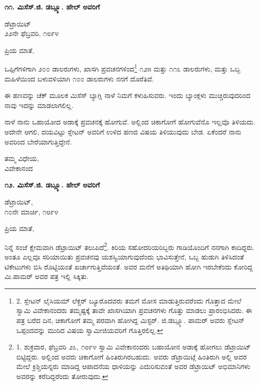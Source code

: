 \begin{center}
\textbf{೧೧. ಮಿಸೆಸ್.ಜಿ. ಡಬ್ಲ್ಯೂ. ಹೇಲ್ ಅವರಿಗೆ}
\end{center}

\begin{flushright}
ಡೆಟ್ರಾಯಿಟ್\\೨೨ನೇ ಫೆಬ್ರವರಿ, ೧೮೯೪
\end{flushright}

ಪ್ರಿಯ ಮಾತೆ,

ಒಪ್ಪಿಗೆಗಳಿಗಾಗಿ ೨೦೦ ಡಾಲರುಗಳು, ಖಾಸಗಿ ಪ್ರವಚನಗಳಿಂದ\footnote{2. ಸ್ಲೇಟನ್ ಲೈಸಿಯಮ್​ ಲೆಕ್ಚರ್ ಬ್ಯೂರೊದವರು ತಮಗೆ ಮೋಸ ಮಾಡುತ್ತಿರುವರೆಂದು ಗೊತ್ತಾದ ಮೇಲೆ ಸ್ವಾಮಿ ವಿವೇಕಾನಂದರು ತಮ್ಮಷ್ಟಕ್ಕೆ ತಾವೇ ಖಾಸಗಿಯಾಗಿ ಪ್ರವಚನಗಳು ಗೊತ್ತು ಮಾಡಲು ಪ್ರಾರಂಭಿಸಿದರು. ಈ ಪತ್ರ ಬರೆದ ದಿನ, ಚಿಕಾಗೋಗೆ ತಮ್ಮ ಪರವಾಗಿ ಹೋಗಿದ್ದ ಮಿಸ್ಟರ್. ಜಿ.ಡಬ್ಲ್ಯೂ. ಪಾಮರ್ ಅವರು ಸ್ಲೇಟನ್ ಒಪ್ಪಂದವನ್ನು ಮುರಿದ ವಿಷಯ ಸ್ವಾಮೀಜಿಯವರಿಗೆ ಗೊತ್ತಿರಲಿಲ್ಲ.} ೧೨೫ ಮತ್ತು ೧೧೩ ಡಾಲರುಗಳು, ಮತ್ತು ಒಬ್ಬ ಮಹಿಳೆಯಿಂದ ಬಳುವಳಿಯಾಗಿ ೧೦೦ ಡಾಲರುಗಳು ನನಗೆ ದೊರೆತಿವೆ.

ಈ ಹಣವನ್ನು ಚೆಕ್ ಮೂಲಕ ಮಿಸೆಸ್ ಬ್ಯಾಗ್ಲಿ ನಾಳೆ ನಿಮಗೆ ಕಳುಹಿಸುವರು. ಇಂದು ಬ್ಯಾಂಕ್ಗಳು ಮುಚ್ಚಿರುವುದರಿಂದ ನಾವು ಇದನ್ನು ಮಾಡಲಾಗಲಿಲ್ಲ.

ನಾಳೆ ನಾನು ಒಹಾಯೋದ ಅಡಾಕ್ಕೆ ಪ್ರವಚನಕ್ಕೆ ಹೋಗುವೆ. ಅಲ್ಲಿಂದ ಚಿಕಾಗೋಗೆ ಹೋಗುವೆನೊ ಇಲ್ಲವೊ ತಿಳಿಯದು. ಅದೇನೇ ಆಗಲಿ, ದಯವಿಟ್ಟು ಸ್ಲೇಟನ್ ಅವರಿಗೆ ಉಳಿದ ಹಣದ ವಿಷಯ ತಿಳಿಯುವುದು ಬೇಡ. ಏಕೆಂದರೆ ನಾನು ಅವರಿಂದ ಬೇರೆಯಾಗುತ್ತಿದ್ದೇನೆ.

\begin{flushright}
ತಮ್ಮ ವಿಧೇಯ,\\ವಿವೇಕಾನಂದ
\end{flushright}

\begin{center}
\textbf{೧೨. ಮಿಸೆಸ್.ಜಿ. ಡಬ್ಲ್ಯೂ. ಹೇಲ್ ಅವರಿಗೆ}
\end{center}

\begin{flushright}
ಡೆಟ್ರಾಯಿಟ್,\\೧೦ನೇ ಮಾರ್ಚಿ, ೧೮೯೪
\end{flushright}

ಪ್ರಿಯ ಮಾತೆ,

ನಿನ್ನೆ ಸಂಜೆ ಕ್ಷೇಮವಾಗಿ ಡೆಟ್ರಾಯಿಟ್ ತಲುಪಿದೆ\footnote{1. ಶುಕ್ರವಾರ, ಫೆಬ್ರವರಿ ೨೩, ೧೮೯೪ ಸ್ವಾಮಿ ವಿವೇಕಾನಂದರು ಬಹಾಯೋನ ಅಡಾಕ್ಕೆ ಹೋಗಲು ಡೆಟ್ರಾಯಿಟ್ ಬಿಟ್ಟಿದ್ದರು. ಅಲ್ಲಿಂದ ಅವರು ಚಿಕಾಗೋಗೆ ಹಿಂತಿರುಗಿರಬಹುದು. ಅವರು ಡೆಟ್ರಾಯಿಟ್ಗೆ ಹಿಂತಿರುಗಿ ಅಲ್ಲಿ ಅವರ ಮೇಲೆ ಕ್ರಿಶ್ಚಿಯನ್ನರು ಮಾಡಿದ್ದ ಆಪಾದನೆಯ ಧಾಳಿಯನ್ನು ಎದುರಿಸುವಂತೆ ಅವರ ಡೆಟ್ರಾಯಿಟ್ ಅಭಿಮಾನಿಗಳು ಅವರನ್ನು ಕರೆದಿದ್ದರೆಂದು ತೋರುವುದು.}. ಕಿರಿಯ ಸಹೋದರಿಯರಿಬ್ಬರು ಗಾಡಿಯೊಂದಿಗೆ ನನಗಾಗಿ ಕಾದಿದ್ದರು. ಅಂತೂ ಎಲ್ಲವೂ ಸರಿಯಾಯಿತು ಪ್ರವಚನವು ಯಶಸ್ವಿಯಾಗುವುದೆಂದು ಭಾವಿಸುತ್ತೇನೆ, ಒಬ್ಬ ಹುಡುಗಿ ತಿಳಿಸಿದಂತೆ ಟಿಕೇಟುಗಳು ಬಿಸಿ ರೊಟ್ಟಿಯಂತೆ ಖರ್ಚಾಗುತ್ತಿವೆಯಂತೆ. ಅವರ ಮನೆಗೆ ಅತಿಥಿಯಾಗಿ ಹೋಗಿ ಇರಬೇಕೆಂದು ಕೋರಿದ್ದ ಮಿ.ಪಾಮರ್ ಅವರ ಪತ್ರ ಇಲ್ಲಿ ಸಿಕ್ಕಿತು.

